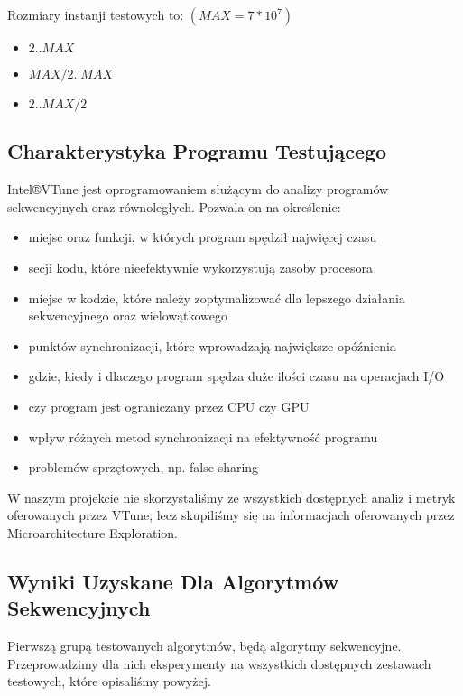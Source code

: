 \documentclass{article}
\begin{document}
                Rozmiary instanji testowych to: $(MAX = 7 * 10^7)$
                \begin{itemize}
                    \item $2 .. MAX$
                    \item $MAX / 2 .. MAX$
                    \item $2 .. MAX / 2$
                \end{itemize}
        
        \subsection{Charakterystyka Programu Testującego}
            Intel®VTune jest oprogramowaniem służącym do analizy programów sekwencyjnych oraz równoległych. Pozwala on na określenie:
            \begin{itemize}
                \item miejsc oraz funkcji, w których program spędził najwięcej czasu
                \item secji kodu, które nieefektywnie wykorzystują zasoby procesora
                \item miejsc w kodzie, które należy zoptymalizować dla lepszego działania sekwencyjnego oraz wielowątkowego
                \item punktów synchronizacji, które wprowadzają największe opóźnienia
                \item gdzie, kiedy i dlaczego program spędza duże ilości czasu na operacjach I/O
                \item czy program jest ograniczany przez CPU czy GPU
                \item wpływ różnych metod synchronizacji na efektywność programu
                \item problemów sprzętowych, np. false sharing
            \end{itemize}
            W naszym projekcie nie skorzystaliśmy ze wszystkich dostępnych analiz i metryk oferowanych przez VTune, lecz skupiliśmy się na informacjach oferowanych przez Microarchitecture Exploration.
        
        \subsection{Wyniki Uzyskane Dla Algorytmów Sekwencyjnych}
            Pierwszą grupą testowanych algorytmów, będą algorytmy sekwencyjne. Przeprowadzimy dla nich eksperymenty na wszystkich dostępnych zestawach testowych, które opisaliśmy powyżej. 
    
    \clearpage
    \printnoidxglossaries
\end{document}
